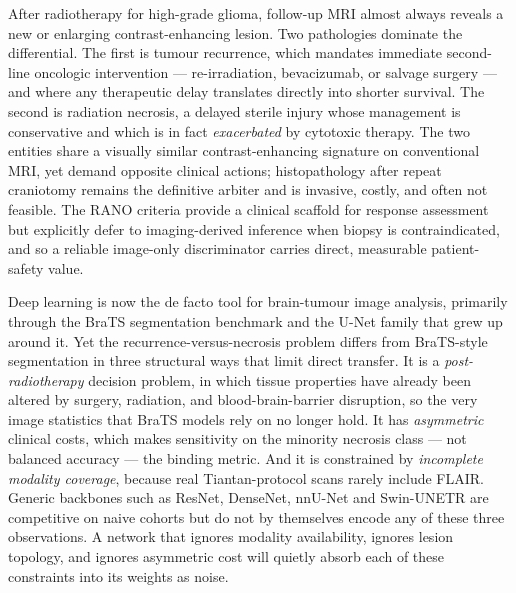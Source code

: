 \documentclass[11pt,a4paper]{article}
\begin{document}
After radiotherapy for high-grade glioma, follow-up MRI almost always reveals a new or enlarging contrast-enhancing lesion. Two pathologies dominate the differential. The first is tumour recurrence, which mandates immediate second-line oncologic intervention --- re-irradiation, bevacizumab, or salvage surgery --- and where any therapeutic delay translates directly into shorter survival. The second is radiation necrosis, a delayed sterile injury whose management is conservative and which is in fact \emph{exacerbated} by cytotoxic therapy. The two entities share a visually similar contrast-enhancing signature on conventional MRI, yet demand opposite clinical actions; histopathology after repeat craniotomy remains the definitive arbiter and is invasive, costly, and often not feasible. The RANO criteria provide a clinical scaffold for response assessment but explicitly defer to imaging-derived inference when biopsy is contraindicated, and so a reliable image-only discriminator carries direct, measurable patient-safety value.

Deep learning is now the de facto tool for brain-tumour image analysis, primarily through the BraTS segmentation benchmark and the U-Net family that grew up around it. Yet the recurrence-versus-necrosis problem differs from BraTS-style segmentation in three structural ways that limit direct transfer. It is a \emph{post-radiotherapy} decision problem, in which tissue properties have already been altered by surgery, radiation, and blood-brain-barrier disruption, so the very image statistics that BraTS models rely on no longer hold. It has \emph{asymmetric} clinical costs, which makes sensitivity on the minority necrosis class --- not balanced accuracy --- the binding metric. And it is constrained by \emph{incomplete modality coverage}, because real Tiantan-protocol scans rarely include FLAIR. Generic backbones such as ResNet, DenseNet, nnU-Net and Swin-UNETR are competitive on naive cohorts but do not by themselves encode any of these three observations. A network that ignores modality availability, ignores lesion topology, and ignores asymmetric cost will quietly absorb each of these constraints into its weights as noise.
\end{document}
